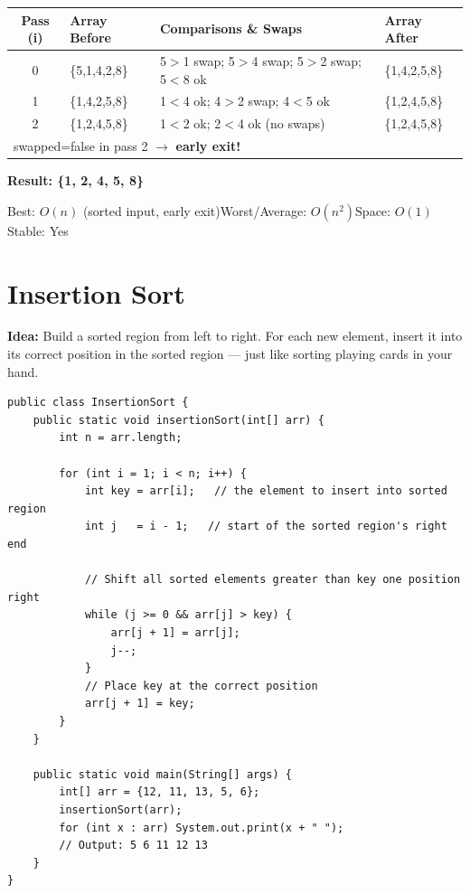 \documentclass[12pt,a4paper,oneside]{book}
\begin{document}
\begin{dryrun}[Dry Run: arr = \{5, 1, 4, 2, 8\}]
\begin{center}
\begin{tabular}{clll}
\toprule
\textbf{Pass (i)} & \textbf{Array Before} & \textbf{Comparisons \& Swaps} & \textbf{Array After}\\
\midrule
0 & \{5,1,4,2,8\} & 5$>$1 swap; 5$>$4 swap; 5$>$2 swap; 5$<$8 ok & \{1,4,2,5,8\}\\
1 & \{1,4,2,5,8\} & 1$<$4 ok; 4$>$2 swap; 4$<$5 ok               & \{1,2,4,5,8\}\\
2 & \{1,2,4,5,8\} & 1$<$2 ok; 2$<$4 ok  (no swaps)               & \{1,2,4,5,8\}\\
\multicolumn{4}{l}{swapped=false in pass 2 $\to$ \textbf{early exit!}}\\
\bottomrule
\end{tabular}
\end{center}
\textbf{Result: \{1, 2, 4, 5, 8\}}
\end{dryrun}

\begin{complexity}
Best: $O(n)$ (sorted input, early exit)\quad Worst/Average: $O(n^2)$\quad Space: $O(1)$\quad Stable: Yes
\end{complexity}

\section{Insertion Sort}

\textbf{Idea:} Build a sorted region from left to right. For each new element, insert it into its correct position in the sorted region --- just like sorting playing cards in your hand.

\begin{lstlisting}[caption={Insertion Sort}]
public class InsertionSort {
    public static void insertionSort(int[] arr) {
        int n = arr.length;

        for (int i = 1; i < n; i++) {
            int key = arr[i];   // the element to insert into sorted region
            int j   = i - 1;   // start of the sorted region's right end

            // Shift all sorted elements greater than key one position right
            while (j >= 0 && arr[j] > key) {
                arr[j + 1] = arr[j];
                j--;
            }
            // Place key at the correct position
            arr[j + 1] = key;
        }
    }

    public static void main(String[] args) {
        int[] arr = {12, 11, 13, 5, 6};
        insertionSort(arr);
        for (int x : arr) System.out.print(x + " ");
        // Output: 5 6 11 12 13
    }
}
\end{lstlisting}
\end{document}
